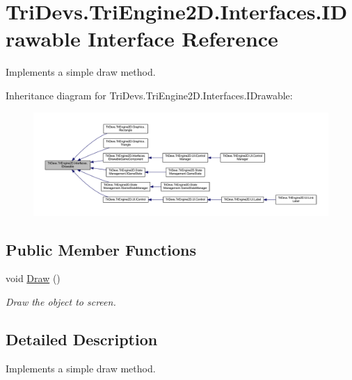 \hypertarget{interface_tri_devs_1_1_tri_engine2_d_1_1_interfaces_1_1_i_drawable}{\section{Tri\-Devs.\-Tri\-Engine2\-D.\-Interfaces.\-I\-Drawable Interface Reference}
\label{interface_tri_devs_1_1_tri_engine2_d_1_1_interfaces_1_1_i_drawable}
}


Implements a simple draw method.  




Inheritance diagram for Tri\-Devs.\-Tri\-Engine2\-D.\-Interfaces.\-I\-Drawable\-:
\nopagebreak
\begin{figure}[H]
\begin{center}
\leavevmode
\includegraphics[width=350pt]{interface_tri_devs_1_1_tri_engine2_d_1_1_interfaces_1_1_i_drawable__inherit__graph}
\end{center}
\end{figure}
\subsection*{Public Member Functions}
\begin{DoxyCompactItemize}
\item 
void \hyperlink{interface_tri_devs_1_1_tri_engine2_d_1_1_interfaces_1_1_i_drawable_a97752e755d82e7dcd22dc173192790a5}{Draw} ()
\begin{DoxyCompactList}\small\item\em Draw the object to screen. \end{DoxyCompactList}\end{DoxyCompactItemize}


\subsection{Detailed Description}
Implements a simple draw method. 



